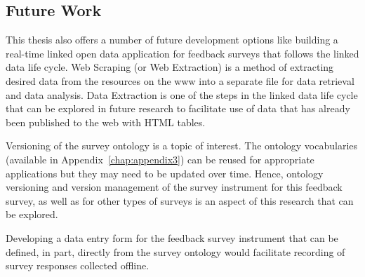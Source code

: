 \begin{doublespace}
\section{Future Work}
\par This thesis also offers a number of future development options like building a real-time linked open data application for feedback surveys that 
follows the linked data life cycle. 
Web Scraping (or Web Extraction) is a method of extracting desired data from the resources on the \ac{www} into a separate file for data retrieval and data analysis. Data Extraction is one of the steps in the linked data life cycle that can be explored in future research to facilitate use of data that has already been published to the web with HTML tables.
\par Versioning of the survey ontology is a topic of interest. The ontology vocabularies (available in Appendix~\ref{chap:appendix3}) can be reused for appropriate applications but they may need to be updated over time.
Hence, ontology versioning and version management of the survey instrument for this feedback survey,
as well as for other types of surveys is an aspect of this research that can be explored.
\par Developing a data entry form for the feedback survey instrument
that can be defined, in part, directly from the survey ontology would facilitate recording of survey responses collected offline.

 \end{doublespace}